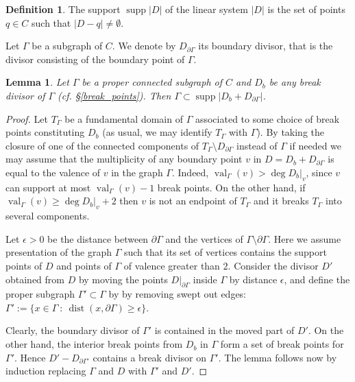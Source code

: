 \documentclass[12pt]{amsart}
\theoremstyle{plain}
\newtheorem{lemma}[theorem]{Lemma}
\theoremstyle{definition}
\newtheorem{definition}[theorem]{Definition}
\theoremstyle{remark}
\newcommand{\suchthat}{\ : \ }
\newcommand{\<}{\langle}   %
\renewcommand{\>}{\rangle} %
\newcommand{\val}{\operatorname{val}}
\newcommand{\dist}{\operatorname{dist}}
\newcommand{\supp}{\operatorname{supp}}
\begin{document}
\begin{definition}
The support $\supp|D|$ of the linear system $|D|$ is the set of points $q\in C$ such that $|D-q|\ne\emptyset$.
\end{definition}


Let $\Gamma$ be a subgraph of $C$. We denote by $D_{\partial\Gamma}$ its boundary divisor, that is the divisor consisting of the boundary point of $\Gamma$.

\begin{lemma}\label{lemma:support}
Let $\Gamma$ be a proper connected subgraph of $C$ and
$D_b$ be any break divisor of $\Gamma$ (cf. \S \ref{break_points}).
Then $\Gamma\subset \supp |D_b+D_{\partial\Gamma}|$.
\end{lemma}
\begin{proof}
Let $T_\Gamma$ be a fundamental domain of $\Gamma$ associated to some choice of break points constituting $D_b$
(as usual, we may identify $T_\Gamma$ with $\Gamma$).
By taking the closure of one of the connected components of $T_\Gamma \setminus D_{\partial\Gamma}$
instead of $\Gamma$ if needed we may assume that the multiplicity of any boundary point $v$ in
$D=D_b+D_{\partial\Gamma}$ is equal to the valence of $v$ in the graph $\Gamma$.
Indeed, $\val_\Gamma (v) >  \deg D_b \vert_v$,
since $v$ can support at most $\val_\Gamma (v) -1$ break points.
On the other hand, if $\val_\Gamma (v) \geq \deg D_b \vert_v+2$
then $v$ is not an endpoint of $T_\Gamma$ and it
breaks $T_\Gamma$ into several components.

Let $\epsilon>0$ be the distance between $\partial\Gamma$
and the vertices of $\Gamma\setminus\partial\Gamma$.
Here we assume presentation of the graph $\Gamma$ such that its set of vertices contains the support points of $D$ and points of $\Gamma$ of valence greater than $2$.
Consider the divisor $D'$ obtained from $D$ by moving the points $D\vert_{\partial\Gamma}$ inside $\Gamma$ by distance $\epsilon$, and define the proper subgraph $\Gamma'\subset\Gamma$ by by removing swept out edges: $\Gamma':=\{x\in \Gamma \suchthat \dist(x,\partial\Gamma) \geq \epsilon \}$.

Clearly, the boundary divisor of $\Gamma'$ is contained in the moved part of $D'$. On the other hand, the interior break points from $D_b$ in $\Gamma$ form a set of break points for $\Gamma'$. Hence $D'-D_{\partial\Gamma'}$ contains a break divisor on $\Gamma'$. The lemma follows now by induction replacing $\Gamma$ and $D$ with $\Gamma'$ and $D'$.
\end{proof}
\end{document}
